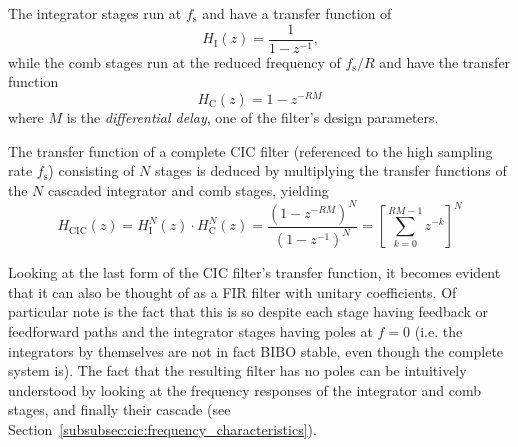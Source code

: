 The integrator stages run at $f_\mathrm{s}$ and have a transfer function of
\begin{equation}
    \label{eq:cic:integrator_stage}
    H_\mathrm{I}(z) = \frac{1}{1-z^{-1}}\text{,}
\end{equation}
while the  comb stages run  at the  reduced frequency of  $f_\mathrm{s}/R$ and
have the transfer function
\begin{equation}
    \label{eq:cic:comb_stage}
    H_\mathrm{C}(z) = 1 - z^{-RM}
\end{equation}
where  $M$  is the  \emph{differential  delay},  one  of the  filter's  design
parameters.

The  transfer function  of  a  complete CIC  filter  (referenced  to the  high
sampling  rate  $f_\mathrm{s}$)  consisting  of   $N$  stages  is  deduced  by
multiplying the  transfer functions  of the $N$  cascaded integrator  and comb
stages, yielding
\begin{equation}
    \label{eq:cic:complete}
    H_\mathrm{CIC}(z) = H_\mathrm{I}^N(z) \cdot H_\mathrm{C}^N(z) =
    \frac{\left(1 - z^{-RM}\right)^N}{\left( 1 - z^{-1} \right)^N} =
    \left[\sum_{k = 0}^{RM-1} z^{-k}\right]^N
\end{equation}

Looking at  the last form  of the CIC  filter's transfer function,  it becomes
evident  that  it  can also  be  thought  of  as  a FIR  filter  with  unitary
coefficients. Of particular  note is  the fact  that this  is so  despite each
stage having  feedback or feedforward  paths and the integrator  stages having
poles at  $f = 0$  (i.e. the  integrators by themselves  are not in  fact BIBO
stable,  even though  the complete  system  is). The fact  that the  resulting
filter has no poles can be  intuitively understood by looking at the frequency
responses of  the integrator and comb  stages, and finally their  cascade (see
Section~\ref{subsubsec:cic:frequency_characteristics}).

